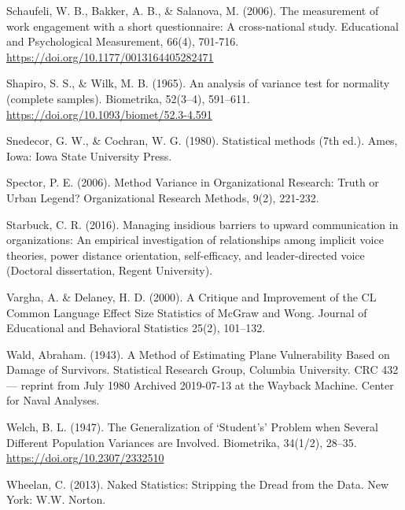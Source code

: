 \documentclass[
]{book}
\begin{document}
Schaufeli, W. B., Bakker, A. B., \& Salanova, M. (2006). The measurement of work engagement with a short questionnaire: A cross-national study. Educational and Psychological Measurement, 66(4), 701-716. \url{https://doi.org/10.1177/0013164405282471}

Shapiro, S. S., \& Wilk, M. B. (1965). An analysis of variance test for normality (complete samples). Biometrika, 52(3--4), 591--611. \url{https://doi.org/10.1093/biomet/52.3-4.591}

Snedecor, G. W., \& Cochran, W. G. (1980). Statistical methods (7th ed.). Ames, Iowa: Iowa State University Press.

Spector, P. E. (2006). Method Variance in Organizational Research: Truth or Urban Legend? Organizational Research Methods, 9(2), 221-232.

Starbuck, C. R. (2016). Managing insidious barriers to upward communication in organizations: An empirical investigation of relationships among implicit voice theories, power distance orientation, self-efficacy, and leader-directed voice (Doctoral dissertation, Regent University).

Vargha, A. \& Delaney, H. D. (2000). A Critique and Improvement of the CL Common Language Effect Size Statistics of McGraw and Wong. Journal of Educational and Behavioral Statistics 25(2), 101--132.

Wald, Abraham. (1943). A Method of Estimating Plane Vulnerability Based on Damage of Survivors. Statistical Research Group, Columbia University. CRC 432 --- reprint from July 1980 Archived 2019-07-13 at the Wayback Machine. Center for Naval Analyses.

Welch, B. L. (1947). The Generalization of `Student's' Problem when Several Different Population Variances are Involved. Biometrika, 34(1/2), 28--35. \url{https://doi.org/10.2307/2332510}

Wheelan, C. (2013). Naked Statistics: Stripping the Dread from the Data. New York: W.W. Norton.

  
\end{document}
